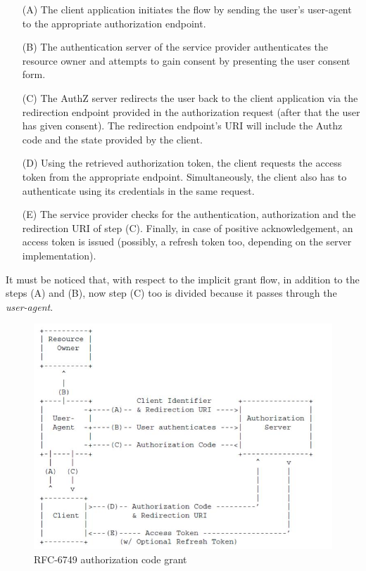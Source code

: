 \begin{itemize}
    \item[(A)]The client application initiates the flow by sending the user's user-agent to the appropriate authorization endpoint.
    \item[(B)]The authentication server of the service provider authenticates the resource owner and attempts to gain consent by presenting the user consent form.
    \item[(C)] The AuthZ server redirects the user back to the client application via the redirection endpoint provided in the authorization request (after that the user has given consent). The redirection endpoint's URI will include the Authz code and the state provided by the client.
    \item[(D)]Using the retrieved authorization token, the client requests the access token from the appropriate endpoint. Simultaneously, the client also has to authenticate using its credentials in the same request.
    \item[(E)] The service provider checks for the authentication, authorization and the redirection URI of step (C). Finally, in case of positive acknowledgement, an access token is issued (possibly, a refresh token too, depending on the server implementation).
\end{itemize}

It must be noticed that, with respect to the implicit grant flow, in addition to the steps (A) and (B), now step (C) too is divided because it passes through the \textit{user-agent}.



\vspace{0.5cm}

\begin{figure}[htbp]
    \centering
    \includegraphics[scale=0.7]{chapters/images/chp2/server.jpg}
    \caption{RFC-6749 authorization code grant}
    \label{fig:serverflow}
\end{figure}

